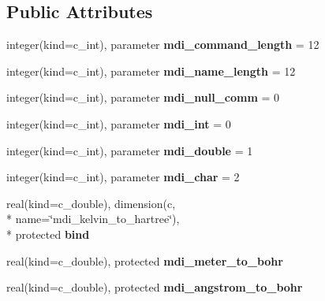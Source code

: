 \subsection*{Public Attributes}
\begin{DoxyCompactItemize}
\item 
\hypertarget{classmdi_a5dd70157d0ceacaa171718ae92d85b2d}{integer(kind=c\-\_\-int), parameter {\bfseries mdi\-\_\-command\-\_\-length} = 12}\label{classmdi_a5dd70157d0ceacaa171718ae92d85b2d}

\item 
\hypertarget{classmdi_a7b06002b55031976d6f1c42f66ef6786}{integer(kind=c\-\_\-int), parameter {\bfseries mdi\-\_\-name\-\_\-length} = 12}\label{classmdi_a7b06002b55031976d6f1c42f66ef6786}

\item 
\hypertarget{classmdi_af79d712d71e077d3178e433909b5a0eb}{integer(kind=c\-\_\-int), parameter {\bfseries mdi\-\_\-null\-\_\-comm} = 0}\label{classmdi_af79d712d71e077d3178e433909b5a0eb}

\item 
\hypertarget{classmdi_abae2888c4daf7459e43cc11e044ee09e}{integer(kind=c\-\_\-int), parameter {\bfseries mdi\-\_\-int} = 0}\label{classmdi_abae2888c4daf7459e43cc11e044ee09e}

\item 
\hypertarget{classmdi_a469cebca4e357b05650fb3fb7ed4b4eb}{integer(kind=c\-\_\-int), parameter {\bfseries mdi\-\_\-double} = 1}\label{classmdi_a469cebca4e357b05650fb3fb7ed4b4eb}

\item 
\hypertarget{classmdi_a2f22a6642786e1f973eb22034bdb35c1}{integer(kind=c\-\_\-int), parameter {\bfseries mdi\-\_\-char} = 2}\label{classmdi_a2f22a6642786e1f973eb22034bdb35c1}

\item 
\hypertarget{classmdi_aff8528c7eb71021e46aa6273c1e8101f}{real(kind=c\-\_\-double), dimension(c, \\*
name=\char`\"{}mdi\-\_\-kelvin\-\_\-to\-\_\-hartree\char`\"{}), \\*
protected {\bfseries bind}}\label{classmdi_aff8528c7eb71021e46aa6273c1e8101f}

\item 
\hypertarget{classmdi_ac2ed0af91b09cc46c7e89c2acde9068a}{real(kind=c\-\_\-double), protected {\bfseries mdi\-\_\-meter\-\_\-to\-\_\-bohr}}\label{classmdi_ac2ed0af91b09cc46c7e89c2acde9068a}

\item 
\hypertarget{classmdi_a15dff5ce38e55b9d0317d758149844b2}{real(kind=c\-\_\-double), protected {\bfseries mdi\-\_\-angstrom\-\_\-to\-\_\-bohr}}\label{classmdi_a15dff5ce38e55b9d0317d758149844b2}


\end{DoxyCompactItemize}
